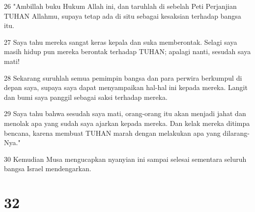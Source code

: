 \par 26 "Ambillah buku Hukum Allah ini, dan taruhlah di sebelah Peti Perjanjian TUHAN Allahmu, supaya tetap ada di situ sebagai kesaksian terhadap bangsa itu.
\par 27 Saya tahu mereka sangat keras kepala dan suka memberontak. Selagi saya masih hidup pun mereka berontak terhadap TUHAN; apalagi nanti, sesudah saya mati!
\par 28 Sekarang suruhlah semua pemimpin bangsa dan para perwira berkumpul di depan saya, supaya saya dapat menyampaikan hal-hal ini kepada mereka. Langit dan bumi saya panggil sebagai saksi terhadap mereka.
\par 29 Saya tahu bahwa sesudah saya mati, orang-orang itu akan menjadi jahat dan menolak apa yang sudah saya ajarkan kepada mereka. Dan kelak mereka ditimpa bencana, karena membuat TUHAN marah dengan melakukan apa yang dilarang-Nya."
\par 30 Kemudian Musa mengucapkan nyanyian ini sampai selesai sementara seluruh bangsa Israel mendengarkan.

\chapter{32}


